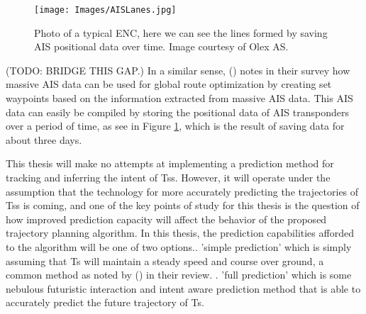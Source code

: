 \begin{figure}[ht!]
    \texttt{[image: Images/AISLanes.jpg]}
    \centering
    \caption{Photo of a typical ENC, here we can see the lines formed by saving AIS positional data over time. Image courtesy of Olex AS.}
    \label{FIG: AIS lanes}
\end{figure}


(TODO: BRIDGE THIS GAP.)\newline
In a similar sense, (\cite{zhang2021collision}) notes in their survey how massive AIS data can be used for global route optimization by
creating set waypoints based on the information extracted from massive AIS data.
This AIS data can easily be compiled by storing the positional data of AIS transponders over a period of time, as see in Figure \ref{FIG: AIS lanes}, which
is the result of saving data for about three days.


This thesis will make no attempts at implementing a prediction method for tracking and inferring the intent of \gls{Ts}s. However, it will
operate under the assumption that the technology for more accurately predicting the trajectories of \gls{Ts}s is coming, and one of the key points
of study for this thesis is the question of how improved prediction capacity will affect the behavior of the proposed trajectory planning algorithm.
In this thesis, the prediction capabilities afforded to the algorithm will be one of two options.. 'simple prediction' which is simply assuming that \gls{Ts} will maintain a steady speed and course over ground, 
a common method as noted by (\cite{huang2020ship}) in their review. . 'full prediction' which is some nebulous futuristic interaction and intent aware prediction method that is able to accurately predict the
future trajectory of \gls{Ts}.




\newpage